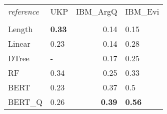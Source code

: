 \begin{tabular}{llrl}
\toprule
\textit{reference} &   UKP &  IBM\_ArgQ & IBM\_Evi \\
  &       &           &         \\
\midrule
Length &  \textbf{0.33} &      0.14 &    0.15 \\
Linear &  0.23 &      0.14 &    0.28 \\
DTree  &     - &      0.17 &    0.25 \\
RF     &  0.34 &      0.25 &    0.33 \\
BERT   &  0.23 &      0.37 &     0.5 \\
BERT\_Q &  0.26 &      \textbf{0.39} &    \textbf{0.56} \\
\bottomrule
\end{tabular}
